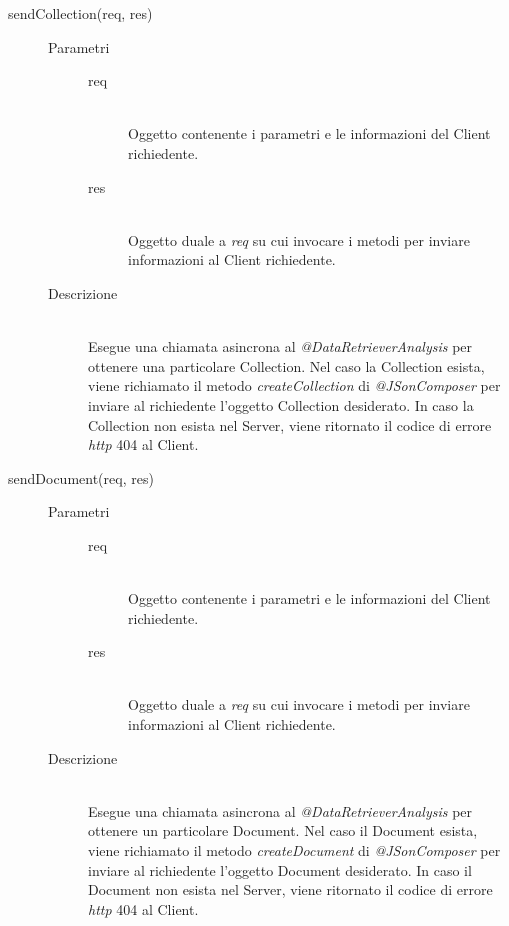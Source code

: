 \begin{description}
\begin{description}
 \item[sendCollection(req, res)] \hfill 
 \begin{description}
 \item[Parametri] \hfill
  \begin{description}
   \item[req] \hfill \\
   Oggetto contenente i parametri e le informazioni del Client richiedente.
   \item[res] \hfill \\
   Oggetto duale a \textit{req} su cui invocare i metodi per inviare informazioni al Client richiedente.
  \end{description}
 \item[Descrizione] \hfill \\
 Esegue una chiamata asincrona al \textit{@DataRetrieverAnalysis} per ottenere una particolare Collection. Nel caso la Collection esista, viene richiamato il metodo \textit{createCollection} di \textit{@JSonComposer} per inviare al richiedente l'oggetto Collection desiderato. In caso la Collection non esista nel Server, viene ritornato il codice di errore \textit{http} 404 al Client.
 \end{description}
 
 \item[sendDocument(req, res)] \hfill 
 \begin{description}
 \item[Parametri] \hfill
  \begin{description}
   \item[req] \hfill \\
   Oggetto contenente i parametri e le informazioni del Client richiedente.
   \item[res] \hfill \\
   Oggetto duale a \textit{req} su cui invocare i metodi per inviare informazioni al Client richiedente.
  \end{description}
 \item[Descrizione] \hfill \\
 Esegue una chiamata asincrona al \textit{@DataRetrieverAnalysis} per ottenere un particolare Document. Nel caso il Document esista, viene richiamato il metodo \textit{createDocument} di \textit{@JSonComposer} per inviare al richiedente l'oggetto Document desiderato. In caso il Document non esista nel Server, viene ritornato il codice di errore \textit{http} 404 al Client.
 \end{description}
 

\end{description}
\end{description}
